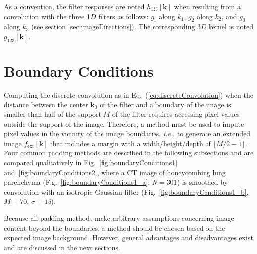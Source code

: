 \documentclass[fleqn,a4paper,oneside,openany]{book}
\begin{document}
As a convention, the filter responses are noted $h_{123}[\boldsymbol{k}]$ when resulting from a convolution with the three 1$D$ filters as follows: $g_1$ along $k_1$, $g_2$ along $k_2$, and $g_3$ along $k_3$ (see section \ref{sec:imageDirections}).
The corresponding 3$D$ kernel is noted $g_{123}[\boldsymbol{k}]$.


\section{Boundary Conditions}\label{sec:boundaryConditions}
%
Computing the discrete convolution as in Eq.~(\ref{eq:discreteConvolution}) when the distance between the center $\boldsymbol{k}_0$ of the filter and a boundary of the image is smaller than half of the support $M$ of the filter requires accessing pixel values outside the support of the image.
Therefore, a method must be used to impute pixel values in the vicinity of the image boundaries, \emph{i.e.}, to generate an extended image $f_{\text{ext}}[\boldsymbol{k}]$ that includes a margin with a width/height/depth of $\lfloor M/2-1 \rfloor$.
Four common padding methods are described in the following subsections and are compared qualitatively in Fig.~\ref{fig:boundaryConditions1} and~\ref{fig:boundaryConditions2}, where a CT image of honeycombing lung parenchyma (Fig.~\ref{fig:boundaryConditions1_a}, $N=301$) is smoothed by convolution with an isotropic Gaussian filter (Fig.~\ref{fig:boundaryConditions1_b}, $M=70$, $\sigma = 15$).

Because all padding methods make arbitrary assumptions concerning image content beyond the boundaries, a method should be chosen based on the expected image background.
However, general advantages and disadvantages exist and are discussed in the next sections.
\end{document}
